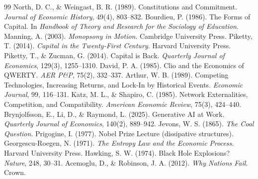 \documentclass[11pt]{article}
\begin{document}
\begin{thebibliography}{99}
 North, D. C., \& Weingast, B. R. (1989). Constitutions and Commitment. \textit{Journal of Economic History}, 49(4), 803--832.
 Bourdieu, P. (1986). The Forms of Capital. In \textit{Handbook of Theory and Research for the Sociology of Education}.
 Manning, A. (2003). \textit{Monopsony in Motion}. Cambridge University Press.
 Piketty, T. (2014). \textit{Capital in the Twenty-First Century}. Harvard University Press.
 Piketty, T., \& Zucman, G. (2014). Capital is Back. \textit{Quarterly Journal of Economics}, 129(3), 1255--1310.
 David, P. A. (1985). Clio and the Economics of QWERTY. \textit{AER P\&P}, 75(2), 332--337.
 Arthur, W. B. (1989). Competing Technologies, Increasing Returns, and Lock-In by Historical Events. \textit{Economic Journal}, 99, 116--131.
 Katz, M. L., \& Shapiro, C. (1985). Network Externalities, Competition, and Compatibility. \textit{American Economic Review}, 75(3), 424--440.
 Brynjolfsson, E., Li, D., \& Raymond, L. (2025). Generative AI at Work. \textit{Quarterly Journal of Economics}, 140(2), 889--942.
 Jevons, W. S. (1865). \textit{The Coal Question}.
 Prigogine, I. (1977). Nobel Prize Lecture (dissipative structures).
 Georgescu-Roegen, N. (1971). \textit{The Entropy Law and the Economic Process}. Harvard University Press.
 Hawking, S. W. (1974). Black Hole Explosions? \textit{Nature}, 248, 30--31.
 Acemoglu, D., \& Robinson, J. A. (2012). \textit{Why Nations Fail}. Crown.
\end{thebibliography}
\end{document}
